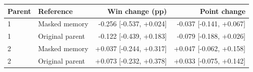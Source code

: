 \begin{tabular}{llrr}
\toprule
Parent & Reference & Win change (pp) & Point change \\
\midrule
1 & Masked memory & -0.256 [-0.537, +0.024] & -0.037 [-0.141, +0.067] \\
1 & Original parent & -0.122 [-0.439, +0.183] & -0.079 [-0.188, +0.026] \\
2 & Masked memory & +0.037 [-0.244, +0.317] & +0.047 [-0.062, +0.158] \\
2 & Original parent & +0.073 [-0.232, +0.378] & +0.033 [-0.075, +0.142] \\
\bottomrule
\end{tabular}
